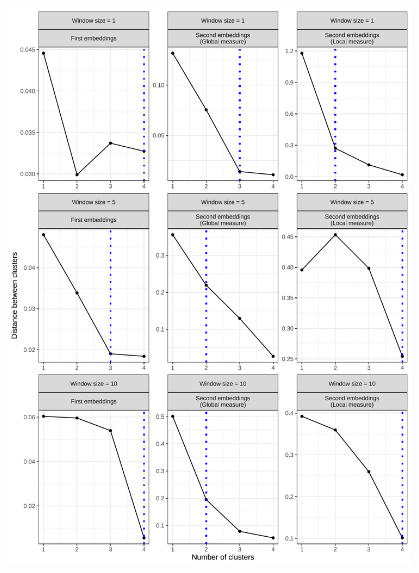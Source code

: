 \begin{figure}[H]
  \centering
  \includegraphics[width=0.95\textwidth]{figures_new/measures/screeplot.pdf}
\end{figure}

